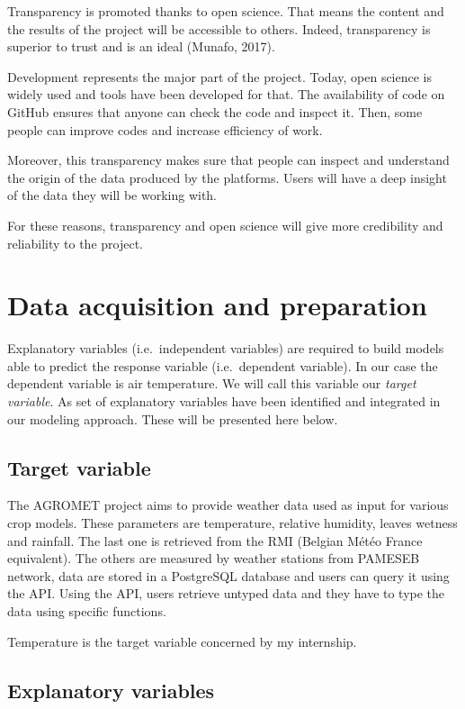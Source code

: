\documentclass[12pt,twoside]{reedthesis}
\theoremstyle{definition}
\theoremstyle{definition}
\theoremstyle{definition}
\theoremstyle{remark}
\begin{document}
Transparency is promoted thanks to open science. That means the content
and the results of the project will be accessible to others. Indeed,
transparency is superior to trust and is an ideal (Munafo, 2017).

Development represents the major part of the project. Today, open
science is widely used and tools have been developed for that. The
availability of code on GitHub ensures that anyone can check the code
and inspect it. Then, some people can improve codes and increase
efficiency of work.

Moreover, this transparency makes sure that people can inspect and
understand the origin of the data produced by the platforms. Users will
have a deep insight of the data they will be working with.

For these reasons, transparency and open science will give more
credibility and reliability to the project.

\chapter{Data acquisition and preparation}\label{data-acq}

Explanatory variables (i.e.~independent variables) are required to build
models able to predict the response variable (i.e.~dependent variable).
In our case the dependent variable is air temperature. We will call this
variable our \emph{target variable}. As set of explanatory variables
have been identified and integrated in our modeling approach. These will
be presented here below.

\section{Target variable}\label{target-variable}

The AGROMET project aims to provide weather data used as input for
various crop models. These parameters are temperature, relative
humidity, leaves wetness and rainfall. The last one is retrieved from
the RMI (Belgian Météo France equivalent). The others are measured by
weather stations from PAMESEB network, data are stored in a PostgreSQL
database and users can query it using the API. Using the API, users
retrieve untyped data and they have to type the data using specific
functions.

Temperature is the target variable concerned by my internship.

\section{Explanatory variables}\label{explanatory-variables}
\end{document}
